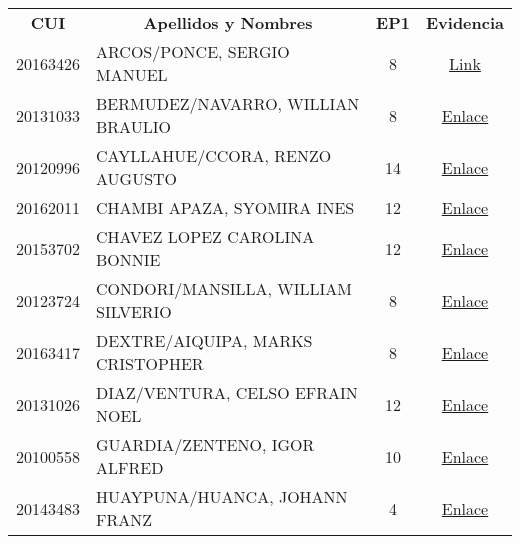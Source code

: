 \begin{table}[hbt!]
	\begin{tabular}{clcc}
		\textbf{CUI} & \multicolumn{1}{c}{\textbf{Apellidos y Nombres}} & \textbf{EP1} & \multicolumn{1}{l}{\textbf{Evidencia}} \\
		20163426     & ARCOS/PONCE, SERGIO MANUEL                       & 8            & \href{https://drive.google.com/open?id=1WYgqT2JCTGtzgXqbM5qQqxSmqwJcihF1}{Link}                                    \\
		20131033     & BERMUDEZ/NAVARRO, WILLIAN BRAULIO                & 8            & \href{https://drive.google.com/open?id=1H7Mn9tqpeo8jPnXsGEfFqS-yYBD0bWml94uqkU9Wk-Y}{Enlace}                                    \\
		20120996     & CAYLLAHUE/CCORA, RENZO AUGUSTO                   & 14           & \href{https://drive.google.com/open?id=1H7Mn9tqpeo8jPnXsGEfFqS-yYBD0bWml94uqkU9Wk-Y}{Enlace}                                    \\
		20162011     & CHAMBI APAZA, SYOMIRA INES                       & 12           & \href{https://drive.google.com/open?id=1H7Mn9tqpeo8jPnXsGEfFqS-yYBD0bWml94uqkU9Wk-Y}{Enlace}                                    \\
		20153702     & CHAVEZ LOPEZ CAROLINA BONNIE                     & 12           & \href{https://drive.google.com/open?id=1H7Mn9tqpeo8jPnXsGEfFqS-yYBD0bWml94uqkU9Wk-Y}{Enlace}                                    \\
		20123724     & CONDORI/MANSILLA, WILLIAM SILVERIO               & 8            & \href{https://drive.google.com/open?id=1H7Mn9tqpeo8jPnXsGEfFqS-yYBD0bWml94uqkU9Wk-Y}{Enlace}                                    \\
		20163417     & DEXTRE/AIQUIPA, MARKS CRISTOPHER                 & 8            & \href{https://drive.google.com/open?id=1H7Mn9tqpeo8jPnXsGEfFqS-yYBD0bWml94uqkU9Wk-Y}{Enlace}                                    \\
		20131026     & DIAZ/VENTURA, CELSO EFRAIN NOEL                  & 12           & \href{https://drive.google.com/open?id=1H7Mn9tqpeo8jPnXsGEfFqS-yYBD0bWml94uqkU9Wk-Y}{Enlace}                                    \\
		20100558     & GUARDIA/ZENTENO, IGOR ALFRED                     & 10           & \href{https://drive.google.com/open?id=1H7Mn9tqpeo8jPnXsGEfFqS-yYBD0bWml94uqkU9Wk-Y}{Enlace}                                    \\
		20143483     & HUAYPUNA/HUANCA, JOHANN FRANZ                    & 4            & \href{https://drive.google.com/open?id=1H7Mn9tqpeo8jPnXsGEfFqS-yYBD0bWml94uqkU9Wk-Y}{Enlace}                                    \\

\end{tabular}
\end{table}
